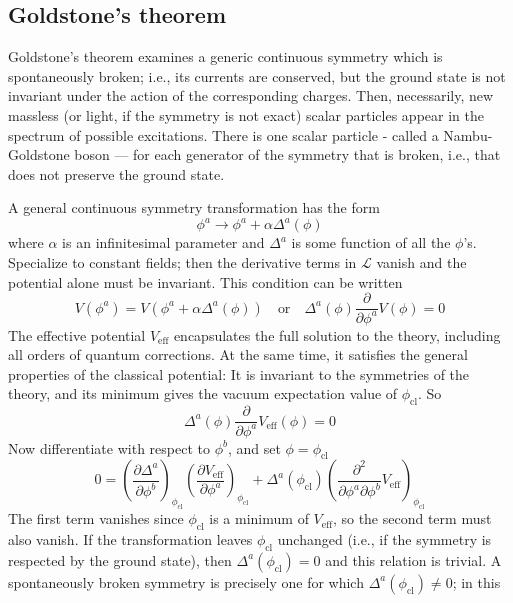 \documentclass[cyan]{elegantnote}
\begin{document}
\subsection{Goldstone's theorem}
\begin{newthem}
Goldstone's theorem examines a generic continuous symmetry which is spontaneously broken; i.e., its currents are conserved, but the ground state is not invariant under the action of the corresponding charges. Then, necessarily, new massless (or light, if the symmetry is not exact) scalar particles appear in the spectrum of possible excitations. There is one scalar particle - called a Nambu-Goldstone boson — for each generator of the symmetry that is broken, i.e., that does not preserve the ground state.
\end{newthem}
\begin{newproof}
A general continuous symmetry transformation has the form
\[\phi^a \to \phi^a + \alpha \Delta^a (\phi)\]
where $\alpha$ is an infinitesimal parameter and $\Delta^a$ is some function of all the $\phi$'s. Specialize to constant fields; then the derivative terms in $\mathcal{L}$ vanish and the potential alone must be invariant. This condition can be written
\[V(\phi^a) = V(\phi^a + \alpha \Delta^a (\phi)) \quad \mbox{or} \quad \Delta^a(\phi) \frac{\partial}{\partial \phi^a} V(\phi) = 0\]
The effective potential $V_{\mathrm{eff}}$ encapsulates the full solution to the theory, including all orders of quantum corrections. At the same time, it satisfies the general properties of the classical potential: It is invariant to the symmetries of the theory, and its minimum gives the vacuum expectation value of $\phi_{\mathrm{cl}}$. So
\[\Delta^a(\phi) \frac{\partial}{\partial \phi^a} V_{\mathrm{eff}}(\phi) = 0\]
Now differentiate with respect to $\phi^b$, and set $\phi = \phi_{\mathrm{cl}}$
\[0 = \left( \frac{\partial \Delta^a}{\partial \phi^b} \right)_{\phi_{\mathrm{cl}}} \left( \frac{\partial V_{\mathrm{eff}}}{\partial \phi^a}\right)_{\phi_{\mathrm{cl}}} + \Delta^a(\phi_{\mathrm{cl}}) \left( \frac{\partial^2}{\partial \phi^a \partial \phi^b}V_{\mathrm{eff}}\right)_{\phi_{\mathrm{cl}}}\]
The first term vanishes since $\phi_{\mathrm{cl}}$ is a minimum of $V_{\mathrm{eff}}$, so the second term must also vanish. If the transformation leaves $\phi_{\mathrm{cl}}$ unchanged (i.e., if the symmetry is respected by the ground state), then $\Delta^a(\phi_{\mathrm{cl}})=0$ and this relation is trivial. A spontaneously broken symmetry is precisely one for which $\Delta^a(\phi_{\mathrm{cl}}) \neq 0$; in this

\end{newproof}
\end{document}
